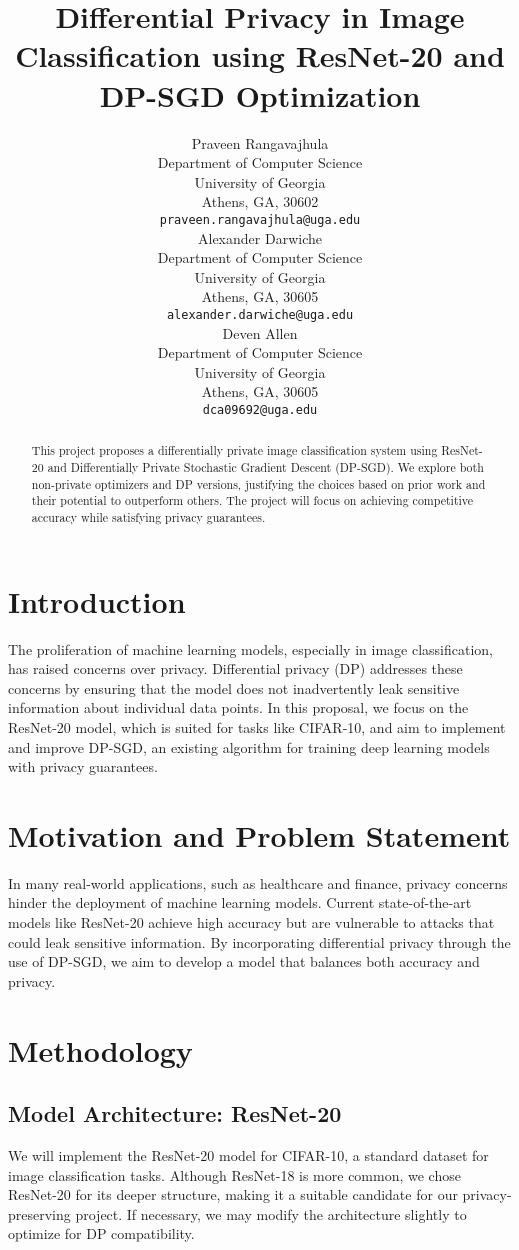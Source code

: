 \documentclass{article}
\title{Differential Privacy in Image Classification using ResNet-20 and DP-SGD Optimization}
\author{
  Praveen Rangavajhula\\
  Department of Computer Science\\
  University of Georgia\\
  Athens, GA, 30602\\
  \texttt{praveen.rangavajhula@uga.edu} \\
  \And
  Alexander Darwiche\\
  Department of Computer Science\\
  University of Georgia\\
  Athens, GA, 30605 \\
  \texttt{alexander.darwiche@uga.edu} \\
  \And
  Deven Allen\\
  Department of Computer Science\\
  University of Georgia\\
  Athens, GA, 30605 \\
  \texttt{dca09692@uga.edu} \\
}
\begin{document}
\maketitle

\begin{abstract}
  This project proposes a differentially private image classification system using ResNet-20 and Differentially Private Stochastic Gradient Descent (DP-SGD). We explore both non-private optimizers and DP versions, justifying the choices based on prior work and their potential to outperform others. The project will focus on achieving competitive accuracy while satisfying privacy guarantees.
\end{abstract}

\section{Introduction}
The proliferation of machine learning models, especially in image classification, has raised concerns over privacy. Differential privacy (DP) addresses these concerns by ensuring that the model does not inadvertently leak sensitive information about individual data points. In this proposal, we focus on the ResNet-20 model, which is suited for tasks like CIFAR-10, and aim to implement and improve DP-SGD, an existing algorithm for training deep learning models with privacy guarantees.

\section{Motivation and Problem Statement}
In many real-world applications, such as healthcare and finance, privacy concerns hinder the deployment of machine learning models. Current state-of-the-art models like ResNet-20 achieve high accuracy but are vulnerable to attacks that could leak sensitive information. By incorporating differential privacy through the use of DP-SGD, we aim to develop a model that balances both accuracy and privacy.

\section{Methodology}
\subsection{Model Architecture: ResNet-20}
We will implement the ResNet-20 model for CIFAR-10, a standard dataset for image classification tasks. Although ResNet-18 is more common, we chose ResNet-20 for its deeper structure, making it a suitable candidate for our privacy-preserving project. If necessary, we may modify the architecture slightly to optimize for DP compatibility.
\end{document}
